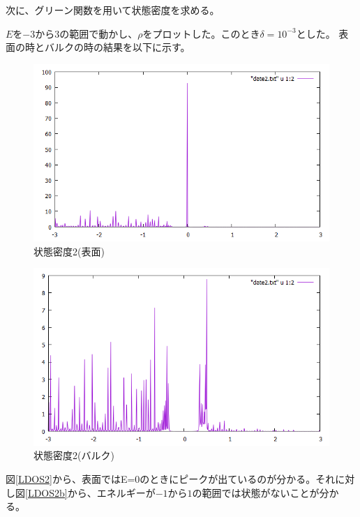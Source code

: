 \documentclass{jsarticle}
\begin{document}
            次に、グリーン関数を用いて状態密度を求める。
            
            $E$を$-3$から$3$の範囲で動かし、$\rho$をプロットした。このとき$\delta=10^{-3}$とした。
            表面の時とバルクの時の結果を以下に示す。
    
            \begin{figure}[H]
                \centering
                \includegraphics[scale=0.5]{LDOS2.png}
                \caption{状態密度2(表面)}
                \label{LDOS2}
            \end{figure}

            \begin{figure}[H]
                \centering
                \includegraphics[scale=0.5]{LDOS2b.png}
                \caption{状態密度2(バルク)}
                \label{LDOS2b}
            \end{figure}

            図\eqref{LDOS2}から、表面ではE=0のときにピークが出ているのが分かる。それに対し図\eqref{LDOS2b}から、エネルギーが$-1$から$1$の範囲では状態がないことが分かる。
    
\end{document}
